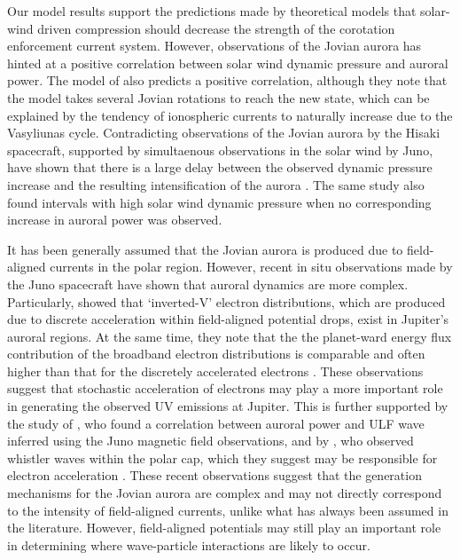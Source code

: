 Our model results support the predictions made by theoretical models \cite{Cowley2003a,Cowley2007,Southwood2001a} that solar-wind driven compression should decrease the strength of the corotation enforcement current system. However, observations of the Jovian aurora has hinted at a positive correlation between solar wind dynamic pressure and auroral power. The model of  also predicts a positive correlation, although they note that the model takes several Jovian rotations to reach the new state, which can be explained by the tendency of ionospheric currents to naturally increase due to the Vasyliunas cycle. Contradicting observations of the Jovian aurora by the Hisaki spacecraft, supported by simultaenous observations in the solar wind by Juno, have shown that there is a large delay between the observed dynamic pressure increase and the resulting intensification of the aurora \cite{Kita2019JovianObservations}. The same study also found intervals with high solar wind dynamic pressure when no corresponding increase in auroral power was observed. 

It has been generally assumed that the Jovian aurora is produced due to field-aligned currents in the polar region. However, recent in situ observations made by the Juno spacecraft have shown that auroral dynamics are more complex. Particularly,  showed that `inverted-V' electron distributions, which are produced due to discrete acceleration within field-aligned potential drops, exist in Jupiter's auroral regions. At the same time, they note that the the planet-ward energy flux contribution of the broadband electron distributions is comparable and often higher than that for the discretely accelerated electrons \cite{Mauk2018DiverseAurora,Mauk2020EnergeticOverview}. These observations suggest that stochastic acceleration of electrons may play a more important role in generating the observed UV emissions at Jupiter. This is further supported by the study of , who found a correlation between auroral power and ULF wave inferred using the Juno magnetic field observations, and by , who observed whistler waves within the polar cap, which they suggest may be responsible for electron acceleration \cite{Elliott2018TheInteractions}. These recent observations suggest that the generation mechanisms for the Jovian aurora are complex and may not directly correspond to the intensity of field-aligned currents, unlike what has always been assumed in the literature. However, field-aligned potentials may still play an important role in determining where wave-particle interactions are likely to occur. 

